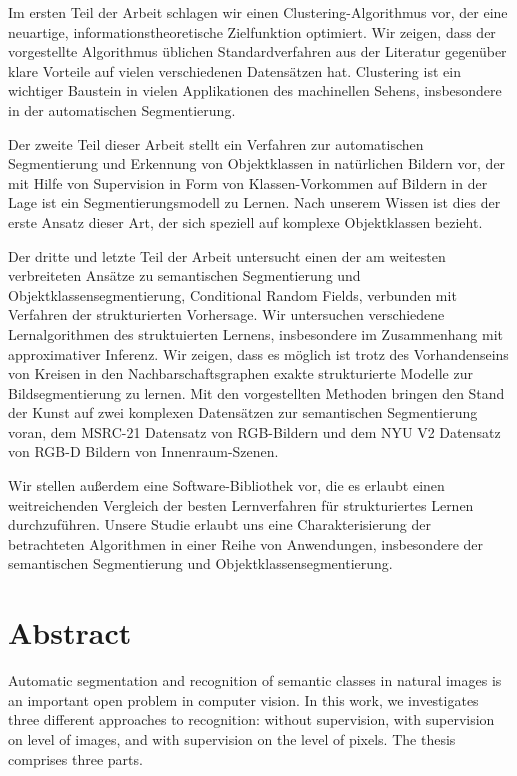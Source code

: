 \documentclass[12pt,toc=bibnumbered, a4paper,twoside,DIV=11,BCOR=.5cm]{scrbook}
\begin{document}
Im ersten Teil der Arbeit schlagen wir einen Clustering-Algorithmus vor,
der eine neuartige, informationstheoretische Zielfunktion optimiert. Wir zeigen, dass
der vorgestellte Algorithmus \"ublichen Standardverfahren aus der Literatur gegen\"uber
klare Vorteile auf vielen verschiedenen Datens\"atzen hat. Clustering ist ein wichtiger
Baustein in vielen Applikationen des machinellen Sehens, insbesondere in der
automatischen Segmentierung.

Der zweite Teil dieser Arbeit stellt ein Verfahren zur automatischen
Segmentierung und Erkennung von Objektklassen in nat\"urlichen Bildern vor, der
mit Hilfe von Supervision in Form von Klassen-Vorkommen auf Bildern in der Lage
ist ein Segmentierungsmodell zu Lernen. Nach unserem Wissen ist dies der erste
Ansatz dieser Art, der sich speziell auf komplexe Objektklassen bezieht.

Der dritte und letzte Teil der Arbeit untersucht einen der am weitesten
verbreiteten Ans\"atze zu semantischen Segmentierung und
Objektklassensegmentierung, Conditional Random Fields, verbunden mit Verfahren
der strukturierten Vorhersage.
%
Wir untersuchen verschiedene Lernalgorithmen des struktuierten Lernens, insbesondere
im Zusammenhang mit approximativer Inferenz. Wir zeigen, dass es m\"oglich ist trotz des Vorhandenseins von
Kreisen in den Nachbarschaftsgraphen exakte strukturierte Modelle zur Bildsegmentierung zu lernen.
Mit den vorgestellten Methoden bringen den Stand der Kunst
auf zwei komplexen Datens\"atzen zur semantischen Segmentierung voran, dem MSRC-21 Datensatz
von RGB-Bildern und dem NYU V2 Datensatz von RGB-D Bildern von Innenraum-Szenen.

Wir stellen au{\ss}erdem eine Software-Bibliothek vor, die es erlaubt einen
weitreichenden Vergleich der besten Lernverfahren f\"ur strukturiertes Lernen
durchzuf\"uhren.
Unsere Studie erlaubt uns eine Charakterisierung der betrachteten Algorithmen
in einer Reihe von Anwendungen, insbesondere der semantischen Segmentierung und
Objektklassensegmentierung.

\chapter*{Abstract}
Automatic segmentation and recognition of semantic classes in natural images is
an important open problem in computer vision.
In this work, we investigates three different approaches to recognition: without supervision,
with supervision on level of images, and with supervision on the level of pixels.
The thesis comprises three parts.
\end{document}
